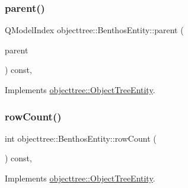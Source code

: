 \mbox{\label{classobjecttree_1_1_benthos_entity_af18ea8bf0bb5188e380155fa22ce06b8}} 
\subsubsection{\texorpdfstring{parent()}{parent()}}
{\footnotesize\ttfamily Q\+Model\+Index objecttree\+::\+Benthos\+Entity\+::parent (\begin{DoxyParamCaption}\item[{const Q\+Model\+Index \&}]{parent }\end{DoxyParamCaption}) const\hspace{0.3cm}{\ttfamily [override]}, {\ttfamily [virtual]}}



Implements \mbox{\hyperlink{classobjecttree_1_1_object_tree_entity_a2d1b13c056476f87637aacd7e99e7305}{objecttree\+::\+Object\+Tree\+Entity}}.

\mbox{\label{classobjecttree_1_1_benthos_entity_af67e02020b32cea699a5177d9e574e4d}} 
\subsubsection{\texorpdfstring{rowCount()}{rowCount()}}
{\footnotesize\ttfamily int objecttree\+::\+Benthos\+Entity\+::row\+Count (\begin{DoxyParamCaption}{ }\end{DoxyParamCaption}) const\hspace{0.3cm}{\ttfamily [override]}, {\ttfamily [virtual]}}



Implements \mbox{\hyperlink{classobjecttree_1_1_object_tree_entity_a82c626bb28c55dcfce11cf7ec3368588}{objecttree\+::\+Object\+Tree\+Entity}}.

\mbox{\label{classobjecttree_1_1_benthos_entity_abbee8f3f8768e62153824707a81a96ff}} 
